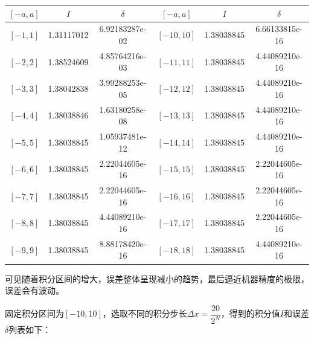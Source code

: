 \documentclass[a4paper]{book}
\begin{document}
\begin{enumerate}
\begin{table}[ht!]
    \begin{center}
    \begin{tabular}{|ccc|ccc|}
        \hline
        $[-a,a]$ & $I$ & $\delta$ & $[-a,a]$ & $I$ & $\delta$ \\
        \hline
        $[-1,1]$ & 1.31117012 & 6.92183287e-02 & $[-10,10]$ & 1.38038845 & 6.66133815e-16 \\
        $[-2,2]$ & 1.38524609 & 4.85764216e-03 & $[-11,11]$ & 1.38038845 & 4.44089210e-16 \\
        $[-3,3]$ & 1.38042838 & 3.99288253e-05 & $[-12,12]$ & 1.38038845 & 4.44089210e-16 \\
        $[-4,4]$ & 1.38038846 & 1.63180258e-08 & $[-13,13]$ & 1.38038845 & 4.44089210e-16 \\
        $[-5,5]$ & 1.38038845 & 1.05937481e-12 & $[-14,14]$ & 1.38038845 & 4.44089210e-16 \\
        $[-6,6]$ & 1.38038845 & 2.22044605e-16 & $[-15,15]$ & 1.38038845 & 2.22044605e-16 \\
        $[-7,7]$ & 1.38038845 & 2.22044605e-16 & $[-16,16]$ & 1.38038845 & 2.22044605e-16 \\
        $[-8,8]$ & 1.38038845 & 4.44089210e-16 & $[-17,17]$ & 1.38038845 & 2.22044605e-16 \\
        $[-9,9]$ & 1.38038845 & 8.88178420e-16 & $[-18,18]$ & 1.38038845 & 4.44089210e-16 \\
        \hline
    \end{tabular}
\end{center}
\end{table}

可见随着积分区间的增大，误差整体呈现减小的趋势，最后逼近机器精度的极限，误差会有波动。

固定积分区间为$[-10,10]$，选取不同的积分步长$\Delta x=\dfrac{20}{2^N}$，得到的积分值$I$和误差$\delta$列表如下：


\end{enumerate}
\end{document}

